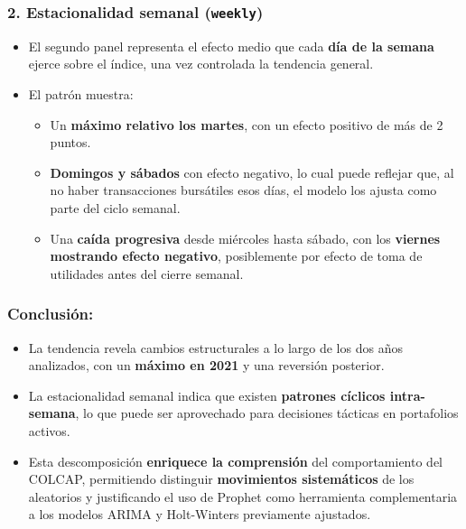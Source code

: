 \documentclass[
  11pt,
]{book}
\providecommand{\tightlist}{%
  \setlength{\itemsep}{0pt}\setlength{\parskip}{0pt}}
\begin{document}
\subsubsection{\texorpdfstring{2. Estacionalidad semanal (\texttt{weekly})}{2. Estacionalidad semanal (weekly)}}\label{estacionalidad-semanal-weekly}

\begin{itemize}
\tightlist
\item
  El segundo panel representa el efecto medio que cada \textbf{día de la semana} ejerce sobre el índice, una vez controlada la tendencia general.
\item
  El patrón muestra:

  \begin{itemize}
  \tightlist
  \item
    Un \textbf{máximo relativo los martes}, con un efecto positivo de más de 2 puntos.
  \item
    \textbf{Domingos y sábados} con efecto negativo, lo cual puede reflejar que, al no haber transacciones bursátiles esos días, el modelo los ajusta como parte del ciclo semanal.
  \item
    Una \textbf{caída progresiva} desde miércoles hasta sábado, con los \textbf{viernes mostrando efecto negativo}, posiblemente por efecto de toma de utilidades antes del cierre semanal.
  \end{itemize}
\end{itemize}

\subsubsection{Conclusión:}\label{conclusiuxf3n}

\begin{itemize}
\tightlist
\item
  La tendencia revela cambios estructurales a lo largo de los dos años analizados, con un \textbf{máximo en 2021} y una reversión posterior.
\item
  La estacionalidad semanal indica que existen \textbf{patrones cíclicos intra-semana}, lo que puede ser aprovechado para decisiones tácticas en portafolios activos.
\item
  Esta descomposición \textbf{enriquece la comprensión} del comportamiento del COLCAP, permitiendo distinguir \textbf{movimientos sistemáticos} de los aleatorios y justificando el uso de Prophet como herramienta complementaria a los modelos ARIMA y Holt-Winters previamente ajustados.
\end{itemize}
\end{document}
